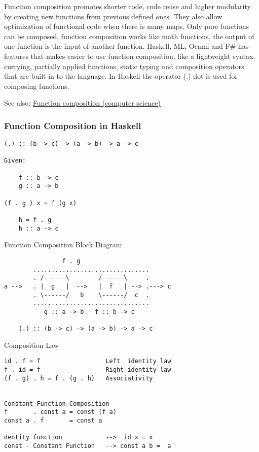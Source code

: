 \documentclass[11pt]{article}
\begin{document}
Function composition promotes shorter code, code reuse and higher
modularity by creating new functions from previous defined ones. They
also allow optimization of functional code when there is many
maps. Only pure functions can be composed, function composition works
like math functions, the output of one function is the input of
another function.  Haskell, ML, Ocaml and F\# has features that makes
easier to use function composition, like a lightweight syntax,
currying, partially applied functions, static typing and composition
operators that are built in to the language.  In Haskell the operator
(.) dot is used for composing functions.

See also: \href{http://en.wikipedia.org/wiki/Function_composition_\%28computer_science\%29}{Function composition (computer science)}

\subsubsection{Function Composition in Haskell}
\label{sec-1-11-2}

\begin{verbatim}
(.) :: (b -> c) -> (a -> b) -> a -> c

Given:
    
    f :: b -> c
    g :: a -> b

(f . g ) x = f (g x)

    h = f . g
    h :: a -> c
\end{verbatim}

Function Composition Block Diagram

\begin{verbatim}
                f . g
        ................................
        . /------\        /------\     . 
a -->   . |  g   |  -->   |  f   | --> .---> c
        . \------/   b    \------/  c  . 
        ................................
           g :: a -> b   f :: b -> c
    
    (.) :: (b -> c) -> (a -> b) -> a -> c
\end{verbatim}


Composition Law

\begin{verbatim}
id . f = f                  Left  identity law
f . id = f                  Right identity law
(f . g) . h = f . (g . h)   Associativity


Constant Function Composition
f       . const a = const (f a)
const a . f       = const a

dentity function            -->  id x = x 
const - Constant Function   --> const a b =  a
\end{verbatim}
\end{document}
